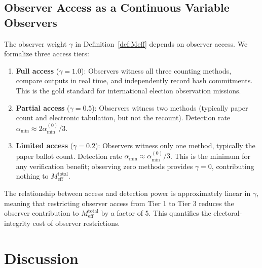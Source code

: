 \documentclass[11pt,a4paper]{article}
\theoremstyle{definition}
\begin{document}
\subsection{Observer Access as a Continuous Variable Observers}
The observer weight $\gamma$ in Definition~\ref{def:Meff} depends on observer access. We formalize three access tiers:
\begin{enumerate}[label=\textbf{Tier \arabic*}:, leftmargin=*]
    \item \textbf{Full access} ($\gamma = 1.0$): Observers witness all three counting methods, compare outputs in real time, and independently record hash commitments. This is the gold standard for international election observation missions.
    \item \textbf{Partial access} ($\gamma = 0.5$): Observers witness two methods (typically paper count and electronic tabulation, but not the recount). Detection rate $\alpha_{\min} \approx 2\alpha_{\min}^{(0)}/3$.
    \item \textbf{Limited access} ($\gamma = 0.2$): Observers witness only one method, typically the paper ballot count. Detection rate $\alpha_{\min} \approx \alpha_{\min}^{(0)}/3$. This is the minimum for any verification benefit; observing zero methods provides $\gamma = 0$, contributing nothing to $M_{\text{eff}}^{\text{total}}$.
\end{enumerate}
The relationship between access and detection power is approximately linear in $\gamma$, meaning that restricting observer access from Tier 1 to Tier 3 reduces the observer contribution to $M_{\text{eff}}^{\text{total}}$ by a factor of 5. This quantifies the electoral-integrity cost of observer restrictions.
\section{Discussion}
\label{sec:discussion}
\end{document}
